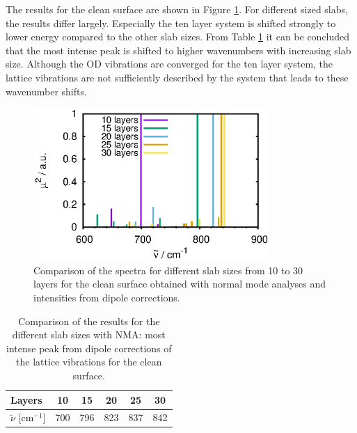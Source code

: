 \documentclass[11pt,DIV=13,BCOR=5mm,a4paper,headinclude]{scrbook}
\begin{document}
The results for the clean surface are shown in Figure \ref{abb:clean_comp_layer}.
For different sized slabs, the results differ largely.
Especially the ten layer system is shifted strongly to lower energy compared to the other slab sizes.
From Table \ref{tab:comp_norm-modes_clean} it can be concluded that the most intense peak is shifted to higher wavenumbers with increasing slab size.
Although the OD vibrations are converged for the ten layer system, the lattice vibrations are not sufficiently described by the system that leads to these wavenumber shifts.


\begin{figure}[!h]
 \centering
 \includegraphics[width=0.8\textwidth]{figures/11-20/comp_freq_surf.eps}
 \caption{Comparison of the spectra for different slab sizes from 10 to 30 layers for the clean surface obtained with normal mode analyses and intensities from dipole corrections.}
 \label{abb:clean_comp_layer}
\end{figure}
\begin{table}[!h]
  \centering
 \caption{Comparison of the results for the different slab sizes with NMA: most intense peak from dipole corrections of the lattice vibrations for the clean surface.}
\vspace*{.2cm} 
  \begin{tabular}{l|ccccc}
  \toprule
Layers& 10&15&20&25&30 \\\midrule
$\tilde{\nu}$ [cm$^{-1}$] &700 &796& 823&837 & 842\\\bottomrule
  \end{tabular}
  \label{tab:comp_norm-modes_clean}
\end{table}
\end{document}
